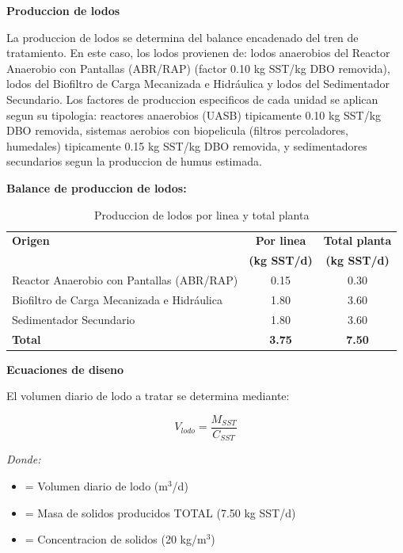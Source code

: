 \documentclass[12pt,a4paper]{article}
\begin{document}
\textbf{Produccion de lodos}

La produccion de lodos se determina del balance encadenado del tren de tratamiento. En este caso, los lodos provienen de: lodos anaerobios del Reactor Anaerobio con Pantallas (ABR/RAP) (factor 0.10 kg SST/kg DBO removida), lodos del Biofiltro de Carga Mecanizada e Hidráulica y lodos del Sedimentador Secundario. Los factores de produccion especificos de cada unidad se aplican segun su tipologia: reactores anaerobios (UASB) tipicamente 0.10 kg SST/kg DBO removida, sistemas aerobios con biopelicula (filtros percoladores, humedales) tipicamente 0.15 kg SST/kg DBO removida, y sedimentadores secundarios segun la produccion de humus estimada.

\textbf{Balance de produccion de lodos:}

\begin{table}[H]
\centering
\small
\caption{Produccion de lodos por linea y total planta}
\begin{tabular}{p{6cm}cc}
\toprule
\textbf{Origen} & \textbf{Por linea} & \textbf{Total planta} \\
 & \textbf{(kg SST/d)} & \textbf{(kg SST/d)} \\
\midrule
Reactor Anaerobio con Pantallas (ABR/RAP) & 0.15 & 0.30 \\
Biofiltro de Carga Mecanizada e Hidráulica & 1.80 & 3.60 \\
Sedimentador Secundario & 1.80 & 3.60 \\
\midrule
\textbf{Total} & \textbf{3.75} & \textbf{7.50} \\
\bottomrule
\end{tabular}
\end{table}

\textbf{Ecuaciones de diseno}

El volumen diario de lodo a tratar se determina mediante:

\begin{equation}
V_{lodo} = \frac{M_{SST}}{C_{SST}}
\end{equation}

\textit{Donde:}
\begin{itemize}[noitemsep,leftmargin=2em]
    \item[$V_{lodo}$] = Volumen diario de lodo (m$^3$/d)
    \item[$M_{SST}$] = Masa de solidos producidos TOTAL (7.50 kg SST/d)
    \item[$C_{SST}$] = Concentracion de solidos (20 kg/m$^3$)
\end{itemize}
\end{document}
